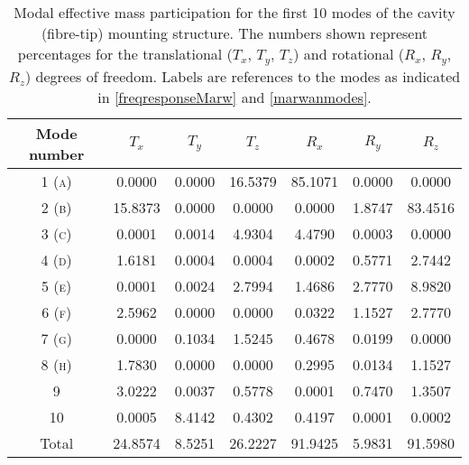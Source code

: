 \documentclass[../Thesis-IJspeert.tex]{subfiles}
\begin{document}
\begin{table}[h]
	\centering
	\begin{tabular}{ccccccc}
		\toprule
		{Mode number} & { ${T}_x$} & {${T}_y$} & {${T}_z$} & {${R}_x$} & {${R}_y$} & {${R}_z$} \\
		\midrule
		1 (\textsc{a}) & 0.0000 & 0.0000 & 16.5379 & 85.1071 & 0.0000 & 0.0000 \\
		2 (\textsc{b}) & 15.8373 & 0.0000 & 0.0000 & 0.0000 & 1.8747 & 83.4516 \\
		3 (\textsc{c}) & 0.0001 & 0.0014 & 4.9304 & 4.4790 & 0.0003 & 0.0000 \\
		4 (\textsc{d}) & 1.6181 & 0.0004 & 0.0004 & 0.0002 & 0.5771 & 2.7442 \\
		5 (\textsc{e}) & 0.0001 & 0.0024 & 2.7994 & 1.4686 & 2.7770 & 8.9820 \\
		6 (\textsc{f}) & 2.5962 & 0.0000 & 0.0000 & 0.0322 & 1.1527 & 2.7770 \\
		7 (\textsc{g}) & 0.0000 & 0.1034 & 1.5245 & 0.4678 & 0.0199 & 0.0000 \\
		8 (\textsc{h}) & 1.7830 & 0.0000 & 0.0000 & 0.2995 & 0.0134 & 1.1527 \\
		9 & 3.0222 & 0.0037 & 0.5778 & 0.0001 & 0.7470 & 1.3507 \\
		10 & 0.0005 & 8.4142 & 0.4302 & 0.4197 & 0.0001 & 0.0002 \\
		\midrule
		{Total} & 24.8574 & 8.5251 & 26.2227 & 91.9425 & 5.9831 & 91.5980 \\
		\bottomrule
	\end{tabular}
\caption[Percentages of modal effective mass for cavity (fibre-tip) mounting structure]{Modal effective mass participation for the first 10 modes of the cavity (fibre-tip) mounting structure. The numbers shown represent percentages for the translational (${T}_x$, ${T}_y$, ${T}_z$) and rotational (${R}_x$, ${R}_y$, ${R}_z$) degrees of freedom. Labels are references to the modes as indicated in \autoref{freqresponseMarw} and \autoref{marwanmodes}.}
	\label{modeparticipationM}
\end{table}
\end{document}

